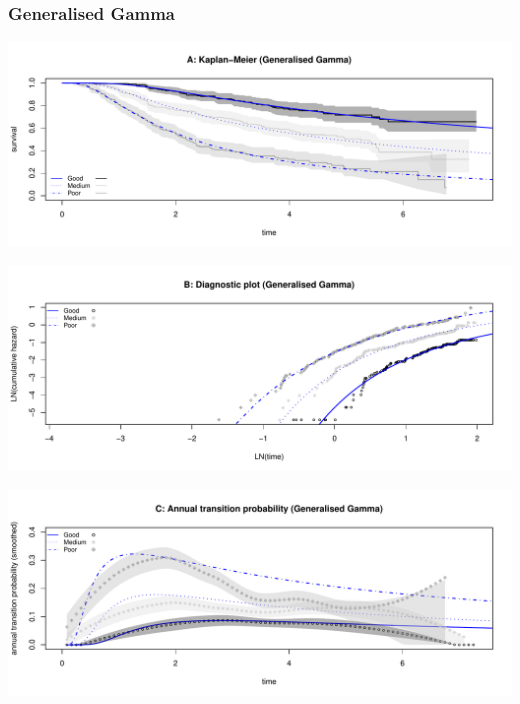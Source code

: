 \documentclass[
]{article}
\begin{document}
\clearpage

\subsubsection{Generalised Gamma}\label{generalised-gamma}

\begin{flushleft}\includegraphics[height=0.25\textheight]{BC_OS_output/Images/Figure_param_models-19} \end{flushleft}

\begin{flushleft}\includegraphics[height=0.25\textheight]{BC_OS_output/Images/Figure_param_models-20} \end{flushleft}

\begin{flushleft}\includegraphics[height=0.25\textheight]{BC_OS_output/Images/Figure_param_models-21} \end{flushleft}
\end{document}
